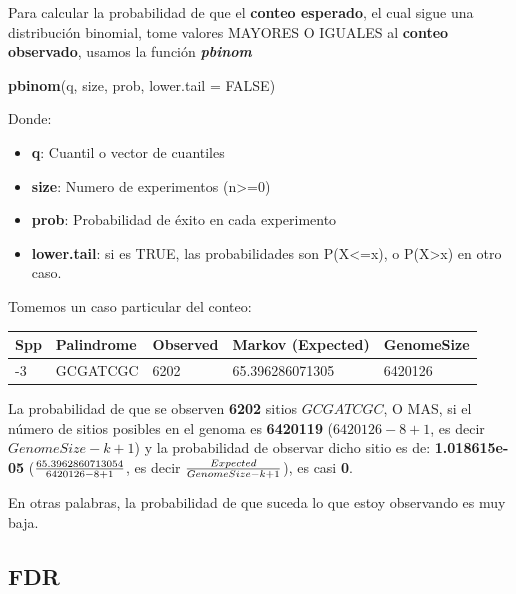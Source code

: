 \documentclass[
]{book}
\newenvironment{Shaded}{\begin{snugshade}}{\end{snugshade}}
\newcommand{\AttributeTok}[1]{\textcolor[rgb]{0.13,0.29,0.53}{#1}}
\newcommand{\ConstantTok}[1]{\textcolor[rgb]{0.56,0.35,0.01}{#1}}
\newcommand{\FunctionTok}[1]{\textcolor[rgb]{0.13,0.29,0.53}{\textbf{#1}}}
\newcommand{\NormalTok}[1]{#1}
\providecommand{\tightlist}{%
  \setlength{\itemsep}{0pt}\setlength{\parskip}{0pt}}
\begin{document}
Para calcular la probabilidad de que el \textbf{conteo esperado}, el cual sigue una distribución binomial, tome valores MAYORES O IGUALES al \textbf{conteo observado}, usamos la función \textbf{\emph{pbinom}}

\begin{Shaded}
\begin{Highlighting}[]
\FunctionTok{pbinom}\NormalTok{(q, size, prob, }\AttributeTok{lower.tail =} \ConstantTok{FALSE}\NormalTok{)  }
\end{Highlighting}
\end{Shaded}

Donde:

\begin{itemize}
\tightlist
\item
  \textbf{q}: Cuantil o vector de cuantiles
\item
  \textbf{size}: Numero de experimentos (n\textgreater=0)
\item
  \textbf{prob}: Probabilidad de éxito en cada experimento
\item
  \textbf{lower.tail}: si es TRUE, las probabilidades son P(X\textless=x), o P(X\textgreater x) en otro caso.
\end{itemize}

Tomemos un caso particular del conteo:

\begin{longtable}[]{@{}lllll@{}}
\toprule\noalign{}
Spp & Palindrome & Observed & Markov (Expected) & GenomeSize \\
\midrule\noalign{}
\endhead
\bottomrule\noalign{}
\endlastfoot
336-3 & GCGATCGC & 6202 & 65.396286071305 & 6420126 \\
\end{longtable}

La probabilidad de que se observen \textbf{6202} sitios \(GCGATCGC\), O MAS, si el número de sitios posibles en el genoma es \textbf{6420119} (\(6420126-8+1\), es decir \(GenomeSize-k+1\)) y la probabilidad de observar dicho sitio es de: \textbf{1.018615e-05} (\(65.3962860713054 \over 6420126-8+1\), es decir \(Expected \over GenomeSize-k+1\)), es casi \textbf{0}.

En otras palabras, la probabilidad de que suceda lo que estoy observando es muy baja.

\hypertarget{fdr}{%
\subsection{FDR}\label{fdr}}
\end{document}
